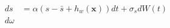 \begin{align}
    ds &= \alpha(s-\bar{s}+h_w(\mathbf x)) dt + \sigma_s dW(t) \\
    d\omega 
\end{align}